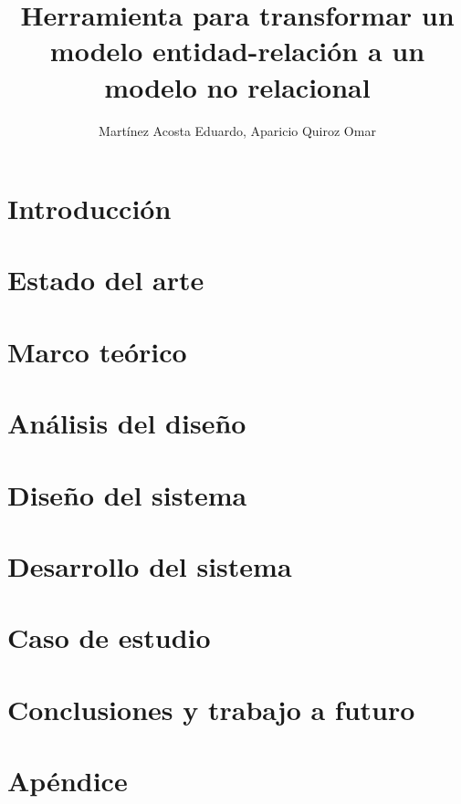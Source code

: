 \documentclass[12pt, a4paper]{report}
\title{Herramienta para transformar un modelo entidad-relación a un modelo no relacional}
\author{Martínez Acosta Eduardo, Aparicio Quiroz Omar}
\theoremstyle{definition}
\theoremstyle{remark}
\begin{document}

\tableofcontents
\listoffigures
\listoftables


\chapter{Introducción}

\chapter{Estado del arte}

\chapter{Marco teórico}

\chapter{Análisis del diseño}

\chapter{Diseño del sistema}

\chapter{Desarrollo del sistema}

\chapter{Caso de estudio}

\chapter{Conclusiones y trabajo a futuro}


\appendix
\chapter{Apéndice}

\printbibliography
\end{document}
